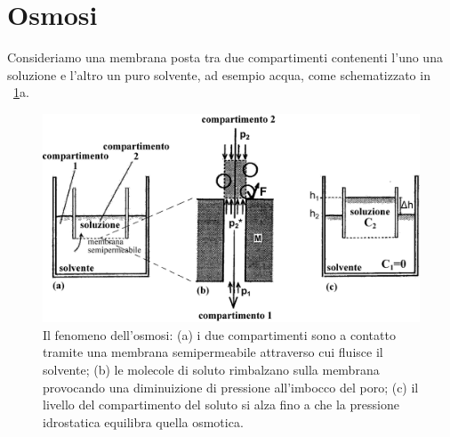 \section{Osmosi}

Consideriamo una membrana posta tra due compartimenti contenenti l'uno una soluzione e l'altro un puro solvente, ad esempio acqua, come schematizzato in \figurename~\ref{osmosi}a.
\begin{figure}[htb]
	\centering
		\includegraphics[width=\textwidth]{immagini/osmosi.eps}
		\caption{Il fenomeno dell'osmosi: (a) i due compartimenti sono a contatto tramite una membrana semipermeabile attraverso cui fluisce il solvente; (b) le molecole di soluto rimbalzano sulla membrana provocando una diminuizione di pressione all'imbocco del poro; (c) il livello del compartimento del soluto si alza fino a che la pressione idrostatica equilibra quella osmotica.}\label{osmosi}
\end{figure}
\noindent
